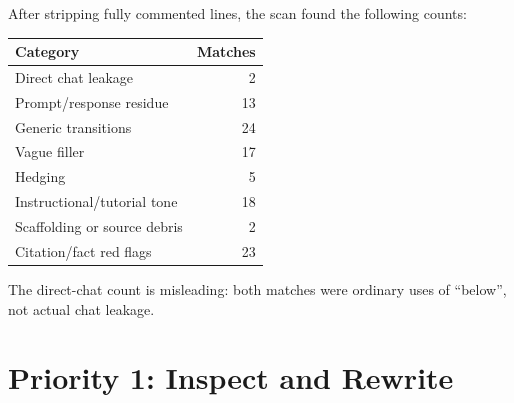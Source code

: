 \documentclass[11pt,a4paper]{article}
\begin{document}
After stripping fully commented lines, the scan found the following counts:

\begin{center}
\begin{tabular}{lr}
\textbf{Category} & \textbf{Matches} \\
\hline
Direct chat leakage & 2 \\
Prompt/response residue & 13 \\
Generic transitions & 24 \\
Vague filler & 17 \\
Hedging & 5 \\
Instructional/tutorial tone & 18 \\
Scaffolding or source debris & 2 \\
Citation/fact red flags & 23 \\
\end{tabular}
\end{center}

The direct-chat count is misleading: both matches were ordinary uses of
``below'', not actual chat leakage.

\section*{Priority 1: Inspect and Rewrite}
\end{document}
